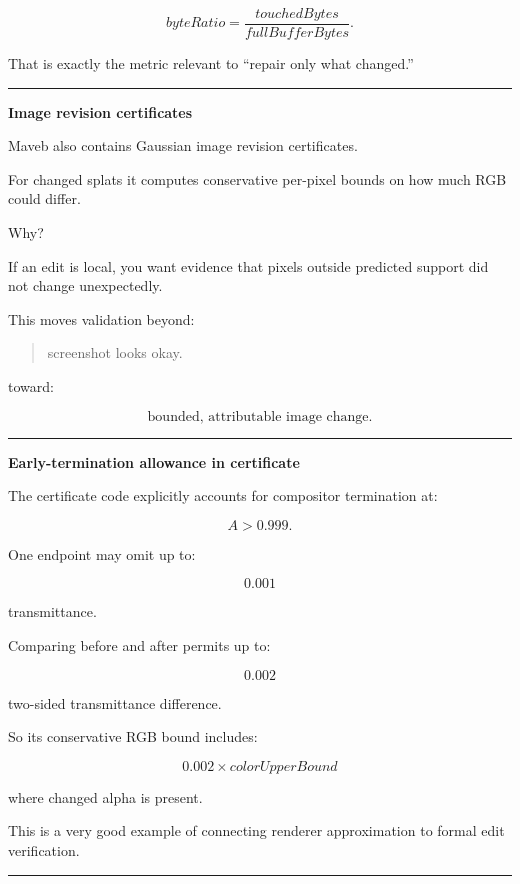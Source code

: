 \[
\boxed{
byteRatio
=
\frac{
touchedBytes
}{
fullBufferBytes
}.
}
\]

That is exactly the metric relevant to ``repair only what changed.''

\begin{center}\rule{0.5\linewidth}{0.5pt}\end{center}

\textbf{Image revision certificates}

Maveb also contains Gaussian image revision certificates.

For changed splats it computes conservative per-pixel bounds on how much RGB could differ.

Why?

If an edit is local, you want evidence that pixels outside predicted support did not change unexpectedly.

This moves validation beyond:

\begin{quote}
screenshot looks okay.
\end{quote}

toward:

\[
\boxed{
\text{bounded, attributable image change}.
}
\]

\begin{center}\rule{0.5\linewidth}{0.5pt}\end{center}

\textbf{Early-termination allowance in certificate}

The certificate code explicitly accounts for compositor termination at:

\[
A>0.999.
\]

One endpoint may omit up to:

\[
0.001
\]

transmittance.

Comparing before and after permits up to:

\[
0.002
\]

two-sided transmittance difference.

So its conservative RGB bound includes:

\[
0.002\times colorUpperBound
\]

where changed alpha is present.

This is a very good example of connecting renderer approximation to formal edit verification.

\begin{center}\rule{0.5\linewidth}{0.5pt}\end{center}

